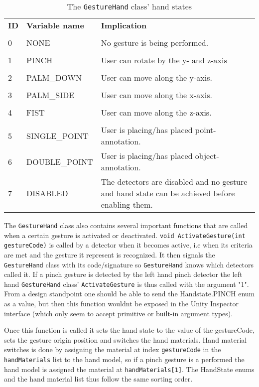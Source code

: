 \begin{table}[]
\centering
\label{tab:handstates}
\begin{tabular}{p{1cm}| p{3.5cm} | p{6cm}}
	\textbf{ID} &  \textbf{Variable name} &   \textbf{Implication} \\\\
	0 & NONE & No gesture is being performed. \\\\
	1 & PINCH & User can rotate by the y- and z-axis \\\\
	2 & PALM\_DOWN & User can move along the y-axis.  \\\\
	3 & PALM\_SIDE & User can move along the x-axis.  \\\\
	4 & FIST & User can move along the z-axis.  \\\\
	5 & SINGLE\_POINT & User is placing/has placed point-annotation.  \\
	6 & DOUBLE\_POINT & User is placing/has placed object-annotation.  \\
	7 & DISABLED & The detectors are disabled and no gesture and hand state can be achieved before enabling them.  
\end{tabular}
\caption{The \texttt{GestureHand} class' hand states}
\end{table}

The \texttt{GestureHand} class also contains several important functions that are called when a certain gesture is activated or deactivated.
\texttt{void ActivateGesture(int gestureCode)} is called by a detector when it becomes active, i.e when its criteria are met and the gesture it represent is recognized.
It then signals the \texttt{GestureHand} class with its code/signature so \texttt{GestureHand} knows which detectors called it.
If a pinch gesture is detected by the left hand pinch detector the left hand \texttt{GestureHand} class' \texttt{ActivateGesture} is thus called with the argument "1".
From a design standpoint one should be able to send the Handstate.PINCH enum as a value, but then this function wouldnt be exposed in the Unity Inspector interface (which
only seem to accept primitive or built-in argument types). 

Once this function is called it sets the hand state to the value of the gestureCode, sets the gesture origin position and switches the hand materials.
Hand material switches is done by assigning the material at index \texttt{gestureCode} in the \texttt{handMaterials} list to the hand model, so 
if a pinch gesture is a performed the hand model is assigned the material at \texttt{handMaterials[1]}. The HandState enums and the hand material list thus 
follow the same sorting order. 

